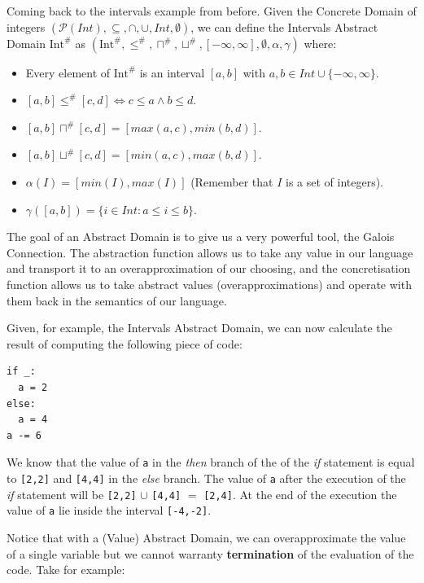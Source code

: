 \documentclass[
11pt, %
english, %
singlespacing, %
headsepline, %
]{MastersDoctoralThesis} %
\providecommand{\tightlist}{%
  \setlength{\itemsep}{0pt}\setlength{\parskip}{0pt}}
\begin{document}
Coming back to the intervals example from before. Given the Concrete
Domain of integers
\((\mathcal{P}(Int), \subseteq, \cap, \cup, Int, \emptyset)\), we can
define the Intervals Abstract Domain \(\text{Int}^{\#}\) as
\((\text{Int}^{\#}, \le^{\#}, \sqcap^{\#}, \sqcup^{\#}, [-\infty,\infty], \emptyset, \alpha, \gamma)\)
where:

\begin{itemize}
\tightlist
\item
  Every element of \(\text{Int}^{\#}\) is an interval \([a, b]\) with
  \(a, b \in Int \cup \{-\infty,\infty\}\).
\item
  \([a, b] \le^{\#} [c, d] \iff c \le a \wedge b \le d\).
\item
  \([a, b] \sqcap^{\#} [c, d] = [max(a,c), min(b, d)]\).
\item
  \([a, b] \sqcup^{\#} [c, d] = [min(a,c), max(b, d)]\).
\item
  \(\alpha(I) = [min(I), max(I)]\) (Remember that \(I\) is a set of
  integers).
\item
  \(\gamma([a, b]) = \{i \in Int : a \le i \le b\}\).
\end{itemize}

The goal of an Abstract Domain is to give us a very powerful tool, the
Galois Connection. The abstraction function allows us to take any value
in our language and transport it to an overapproximation of our
choosing, and the concretisation function allows us to take abstract
values (overapproximations) and operate with them back in the semantics
of our language.

Given, for example, the Intervals Abstract Domain, we can now calculate
the result of computing the following piece of code:

\begin{verbatim}
if _:
  a = 2
else:
  a = 4
a -= 6
\end{verbatim}

We know that the value of \texttt{a} in the \emph{then} branch of the of
the \emph{if} statement is equal to \texttt{{[}2,2{]}} and
\texttt{{[}4,4{]}} in the \emph{else} branch. The value of \texttt{a}
after the execution of the \emph{if} statement will be
\texttt{{[}2,2{]}} \(\cup{}\) \texttt{{[}4,4{]}} \(=\)
\texttt{{[}2,4{]}}. At the end of the execution the value of \texttt{a}
lie inside the interval \texttt{{[}-4,-2{]}}.

Notice that with a (Value) Abstract Domain, we can overapproximate the
value of a single variable but we cannot warranty \textbf{termination}
of the evaluation of the code. Take for example:
\end{document}
